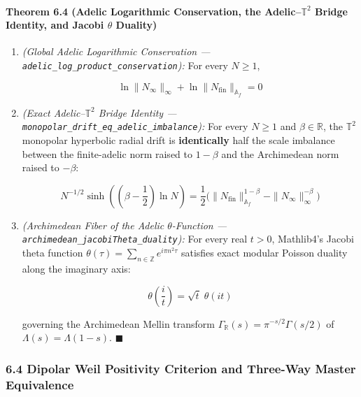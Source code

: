 \documentclass[
  11pt,
]{article}
\begin{document}
\paragraph{\texorpdfstring{Theorem 6.4 (Adelic Logarithmic Conservation,
the Adelic--\(\mathbb{T}^2\) Bridge Identity, and Jacobi \(\theta\)
Duality)}{Theorem 6.4 (Adelic Logarithmic Conservation, the Adelic--\textbackslash mathbb\{T\}\^{}2 Bridge Identity, and Jacobi \textbackslash theta Duality)}}\label{theorem-6.4-adelic-logarithmic-conservation-the-adelicmathbbt2-bridge-identity-and-jacobi-theta-duality}

\begin{enumerate}
\def\labelenumi{\arabic{enumi}.}
\item
  \emph{(Global Adelic Logarithmic Conservation ---
  \texttt{adelic\_log\_product\_conservation}):} For every \(N \ge 1\),

  \[\ln \|N_\infty\|_\infty + \ln \|N_{\text{fin}}\|_{\mathbb{A}_f} = 0\]
\item
  \emph{(Exact Adelic--\(\mathbb{T}^2\) Bridge Identity ---
  \texttt{monopolar\_drift\_eq\_adelic\_imbalance}):} For every
  \(N \ge 1\) and \(\beta \in \mathbb{R}\), the \(\mathbb{T}^2\)
  monopolar hyperbolic radial drift is \textbf{identically} half the
  scale imbalance between the finite-adelic norm raised to \(1 - \beta\)
  and the Archimedean norm raised to \(-\beta\):

  \[N^{-1/2}\sinh\!\left(\left(\beta - \frac{1}{2}\right)\ln N\right) = \frac{1}{2}\Big(\|N_{\text{fin}}\|_{\mathbb{A}_f}^{1-\beta} - \|N_\infty\|_\infty^{-\beta}\Big)\]
\item
  \emph{(Archimedean Fiber of the Adelic \(\theta\)-Function ---
  \texttt{archimedean\_jacobiTheta\_duality}):} For every real
  \(t > 0\), Mathlib4's Jacobi theta function
  \(\theta(\tau) = \sum_{n \in \mathbb{Z}} e^{i\pi n^2 \tau}\) satisfies
  exact modular Poisson duality along the imaginary axis:

  \[\theta\!\left(\frac{i}{t}\right) = \sqrt{t}\;\theta(it)\]

  governing the Archimedean Mellin transform
  \(\Gamma_\mathbb{R}(s) = \pi^{-s/2}\Gamma(s/2)\) of
  \(\Lambda(s) = \Lambda(1-s)\). \(\blacksquare\)
\end{enumerate}

\subsubsection{6.4 Dipolar Weil Positivity Criterion and Three-Way
Master
Equivalence}\label{dipolar-weil-positivity-criterion-and-three-way-master-equivalence}
\end{document}

